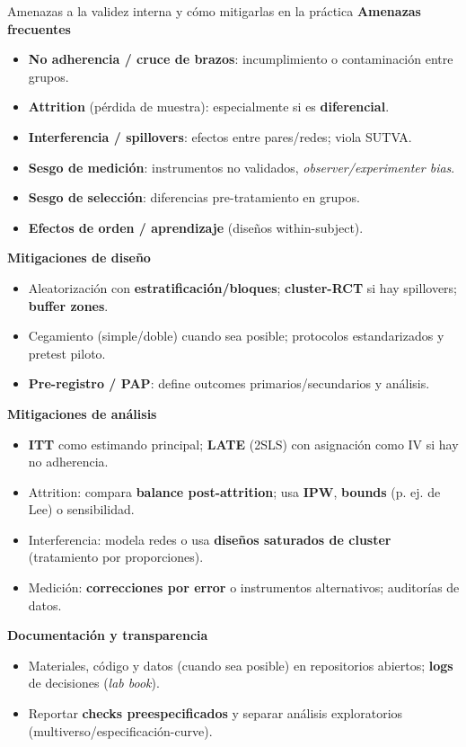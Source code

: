 ﻿\documentclass{beamer}
\begin{document}
\begin{frame}{Amenazas a la validez interna y cómo mitigarlas en la práctica}
\small
\textbf{Amenazas frecuentes}
\begin{itemize}
  \item \textbf{No adherencia / cruce de brazos}: incumplimiento o contaminación entre grupos.
  \item \textbf{Attrition} (pérdida de muestra): especialmente si es \textbf{diferencial}.
  \item \textbf{Interferencia / spillovers}: efectos entre pares/redes; viola SUTVA.
  \item \textbf{Sesgo de medición}: instrumentos no validados, \textit{observer/experimenter bias}.
  \item \textbf{Sesgo de selección}: diferencias pre-tratamiento en grupos.
  \item \textbf{Efectos de orden / aprendizaje} (diseños within-subject).
\end{itemize}

\textbf{Mitigaciones de diseño}
\begin{itemize}
  \item Aleatorización con \textbf{estratificación/bloques}; \textbf{cluster-RCT} si hay spillovers; \textbf{buffer zones}.
  \item Cegamiento (simple/doble) cuando sea posible; protocolos estandarizados y pretest piloto.
  \item \textbf{Pre-registro / PAP}: define outcomes primarios/secundarios y análisis.
\end{itemize}

\textbf{Mitigaciones de análisis}
\begin{itemize}
  \item \textbf{ITT} como estimando principal; \textbf{LATE} (2SLS) con asignación como IV si hay no adherencia.
  \item Attrition: compara \textbf{balance post-attrition}; usa \textbf{IPW}, \textbf{bounds} (p. ej. de Lee) o sensibilidad.
  \item Interferencia: modela redes o usa \textbf{diseños saturados de cluster} (tratamiento por proporciones).
  \item Medición: \textbf{correcciones por error} o instrumentos alternativos; auditorías de datos.
\end{itemize}

\textbf{Documentación y transparencia}
\begin{itemize}
  \item Materiales, código y datos (cuando sea posible) en repositorios abiertos; \textbf{logs} de decisiones (\textit{lab book}).
  \item Reportar \textbf{checks preespecificados} y separar análisis exploratorios (multiverso/especificación-curve).
\end{itemize}
\end{frame}
\end{document}
